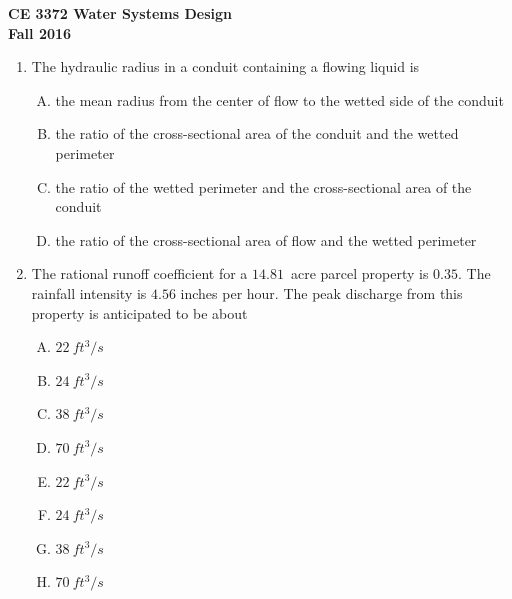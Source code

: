 \documentclass[11pt]{article}
\begin{document}
\begingroup
\begin{center}
{\textbf{{ CE 3372 Water Systems Design}  \\ Fall 2016} }
\end{center}
\endgroup


\begin{enumerate}
\item  The hydraulic radius in a conduit containing a flowing liquid is
\begin{enumerate} [(A)]
\item	the mean radius from the center of flow to the wetted side of the conduit
\item	the ratio of the cross-sectional area of the conduit and the wetted perimeter
\item	the ratio of the wetted perimeter and the cross-sectional area of the conduit
\item	the ratio of the cross-sectional area of flow and the wetted perimeter
\end{enumerate}
\item The rational runoff coefficient for a $14.81$~acre parcel property is $0.35$.  
The rainfall intensity is $4.56$ inches per hour.  
The peak discharge from this property is anticipated to be about
\begin{enumerate} [(A)]
\item $22~ft^3/s$
\item $24~ft^3/s$
\item $38~ft^3/s$
\item $70~ft^3/s$
\item $22~ft^3/s$
\item $24~ft^3/s$
\item $38~ft^3/s$
\item $70~ft^3/s$
\end{enumerate}

\end{enumerate}
\end{document}
